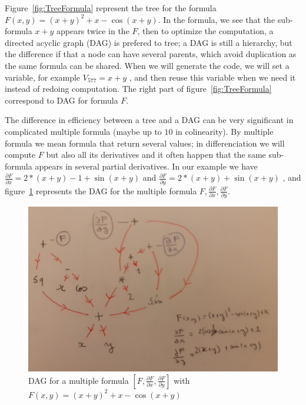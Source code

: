Figure~\ref{fig:TreeFormula} represent the tree for the formula $F(x,y) = (x+y)^2 +x - \cos(x+y)$. 
In the formula, we see that the sub-formula $x+y$ appears twice in the $F$, then to optimize the computation,
a directed acyclic graph (DAG) is prefered to tree;  a DAG  is still a hierarchy, but the difference
if that a node can have several parents, which avoid duplication as the same formula can be shared.
When we will generate the code, we will set a variable, for example $V_{577} = x+y$ , and then reuse
this variable when we need it instead of redoing computation.
The right part of figure~\ref{fig:TreeFormula} correspond to DAG for formula $F$.


The difference in efficiency between a tree and a DAG can be very significant 
in complicated multiple formula  (maybe up to $10$ in colinearity). By multiple formula we mean formula that return several values;
in differenciation we will compute $F$ but also all its derivatives and it often happen that
the same sub-formula appears in several partial derivatives.  In our example we
have $\frac{\partial F}{\partial x} = 2*(x+y) -1 + \sin(x+y)$ and $\frac{\partial F}{\partial y} = 2*(x+y) + \sin(x+y)$ ,
and figure~\ref{fig:DagMultiformula} represents the DAG for the multiple formula
$F,\frac{\partial F}{\partial x},\frac{\partial F}{\partial y}$.



\begin{figure}
\centering
\includegraphics[width=12cm]{Programmer/ImagesProg/DAG.jpg}
\caption{DAG for a multiple formula  $[F,\frac{\partial F}{\partial x}, \frac{\partial F}{\partial y}]$ with $F(x,y) = (x+y)^2 +x - \cos(x+y)$}
\label{fig:DagMultiformula}
\end{figure}




